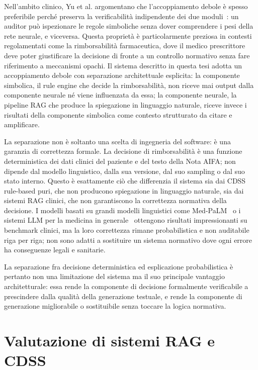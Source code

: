 Nell'ambito clinico, Yu et al. argomentano che l'accoppiamento debole è
spesso preferibile perché preserva la verificabilità indipendente dei due
moduli~\cite{yu2023neuro}: un auditor può ispezionare le regole simboliche
senza dover comprendere i pesi della rete neurale, e viceversa. Questa
proprietà è particolarmente preziosa in contesti regolamentati come la
rimborsabilità farmaceutica, dove il medico prescrittore deve poter
giustificare la decisione di fronte a un controllo normativo senza fare
riferimento a meccanismi opachi. Il sistema descritto in questa tesi adotta
un accoppiamento debole con separazione architettuale esplicita: la componente
simbolica, il rule engine che decide la rimborsabilità, non riceve
mai output dalla componente neurale né viene influenzata da essa; la
componente neurale, la pipeline RAG che produce la spiegazione in
linguaggio naturale, riceve invece i risultati della componente simbolica
come contesto strutturato da citare e amplificare.

La separazione non è soltanto una scelta di ingegneria del software: è una
garanzia di correttezza formale. La decisione di rimborsabilità è una
funzione deterministica dei dati clinici del paziente e del testo della Nota
AIFA; non dipende dal modello linguistico, dalla sua versione, dal suo
sampling o dal suo stato interno. Questo è esattamente ciò che differenzia
il sistema sia dai CDSS rule-based puri, che non producono spiegazione in
linguaggio naturale, sia dai sistemi RAG clinici, che non garantiscono
la correttezza normativa della decisione. I modelli basati su grandi modelli
linguistici come Med-PaLM~\cite{singhal2023medpalm} o i sistemi LLM per la
medicina in generale~\cite{thirunavukarasu2023llm} ottengono risultati
impressionanti su benchmark clinici, ma la loro correttezza rimane
probabilistica e non auditabile riga per riga; non sono adatti a sostituire
un sistema normativo dove ogni errore ha conseguenze legali e sanitarie.

La separazione fra decisione deterministica ed esplicazione probabilistica
è pertanto non una limitazione del sistema ma il suo principale vantaggio
architetturale: essa rende la componente di decisione formalmente verificabile
a prescindere dalla qualità della generazione testuale, e rende la componente
di generazione migliorabile o sostituibile senza toccare la logica normativa.


\section{Valutazione di sistemi RAG e CDSS}
\label{sec:metriche-rag}

